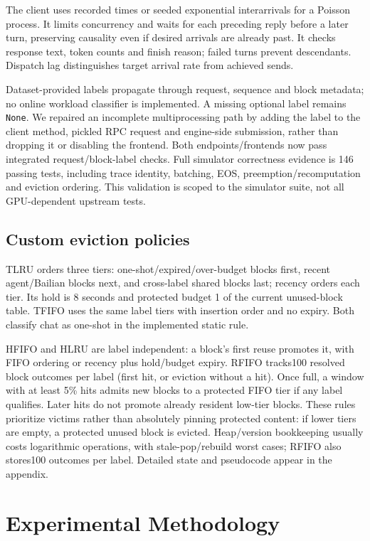 \documentclass{article}
\begin{document}
The client uses recorded times or seeded exponential interarrivals for a Poisson process. It limits concurrency and waits for each preceding reply before a later turn, preserving causality even if desired arrivals are already past. It checks response text, token counts and finish reason; failed turns prevent descendants. Dispatch lag distinguishes target arrival rate from achieved sends.

Dataset-provided labels propagate through request, sequence and block metadata; no online workload classifier is implemented. A missing optional label remains \texttt{None}. We repaired an incomplete multiprocessing path by adding the label to the client method, pickled RPC request and engine-side submission, rather than dropping it or disabling the frontend. Both endpoints/frontends now pass integrated request/block-label checks. Full simulator correctness evidence is 146 passing tests, including trace identity, batching, EOS, preemption/recomputation and eviction ordering. This validation is scoped to the simulator suite, not all GPU-dependent upstream tests.

\subsection{Custom eviction policies}
TLRU orders three tiers: one-shot/expired/over-budget blocks first, recent agent/Bailian blocks next, and cross-label shared blocks last; recency orders each tier. Its hold is 8 seconds and protected budget 1 of the current unused-block table. TFIFO uses the same label tiers with insertion order and no expiry. Both classify chat as one-shot in the implemented static rule.

HFIFO and HLRU are label independent: a block's first reuse promotes it, with FIFO ordering or recency plus hold/budget expiry. RFIFO tracks100 resolved block outcomes per label (first hit, or eviction without a hit). Once full, a window with at least 5\% hits admits new blocks to a protected FIFO tier if any label qualifies. Later hits do not promote already resident low-tier blocks. These rules prioritize victims rather than absolutely pinning protected content: if lower tiers are empty, a protected unused block is evicted. Heap/version bookkeeping usually costs logarithmic operations, with stale-pop/rebuild worst cases; RFIFO also stores100 outcomes per label. Detailed state and pseudocode appear in the appendix.

\section{Experimental Methodology}
\end{document}

